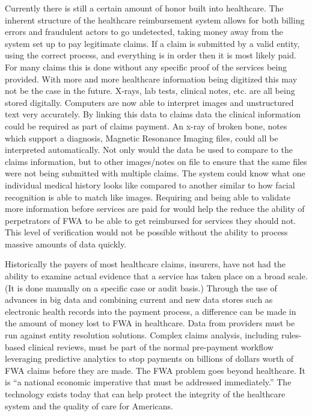 \documentclass[sigconf]{acmart}
\begin{document}
Currently there is still a certain amount of honor built into healthcare.  The inherent 
structure of the healthcare reimbursement system allows for both billing errors and 
fraudulent actors to go undetected, taking money away from the system set up to pay 
legitimate claims.\cite{RevCycle}  If a claim is submitted by a valid entity, using the 
correct process, and everything is in order then it is most likely paid.  For many claims this 
is done without any specific proof of the services being provided.  With more and more 
healthcare information being digitized this may not be the case in the future.  X-rays, lab 
tests, clinical notes, etc. are all being stored digitally.  Computers are now able to interpret 
images and unstructured text very accurately.  By linking this data to claims data the clinical 
information could be required as part of claims payment.  An x-ray of broken bone, notes which 
support a diagnosis, Magnetic Resonance Imaging files, could all be interpreted automatically.  
Not only would the data be used to compare to the claims information, but to other images/notes 
on file to ensure that the same files were not being submitted with multiple claims.  The system 
could know what one individual medical history looks like compared to another similar to how 
facial recognition is able to match like images.  Requiring and being able to validate more 
information before services are paid for would help the reduce the ability of perpetrators of FWA 
to be able to get reimbursed for services they should not.  This level of verification would not 
be possible without the ability to process massive amounts of data quickly.  


Historically the payers of most healthcare claims, insurers, have not had the 
ability to examine actual evidence that a service has taken place on a broad scale.  (It is done 
manually on a specific case or audit basis.)  Through the use of advances in big data and combining 
current and new data stores such as electronic health records into the payment process, a difference 
can be made in the amount of money lost to FWA in healthcare.  Data from providers must be run 
against entity resolution solutions.  Complex claims analysis, including rules-based clinical 
reviews, must be part of the normal pre-payment workflow leveraging predictive analytics to 
stop payments on billions of dollars worth of FWA claims before they are made.  The FWA problem 
goes beyond healthcare.  It is ``a national economic imperative that must be addressed 
immediately.''\cite{LexisNexis}  The technology exists today that can help protect the
integrity of the healthcare system and the quality of care for Americans. \cite{LexisNexis}
\end{document}
